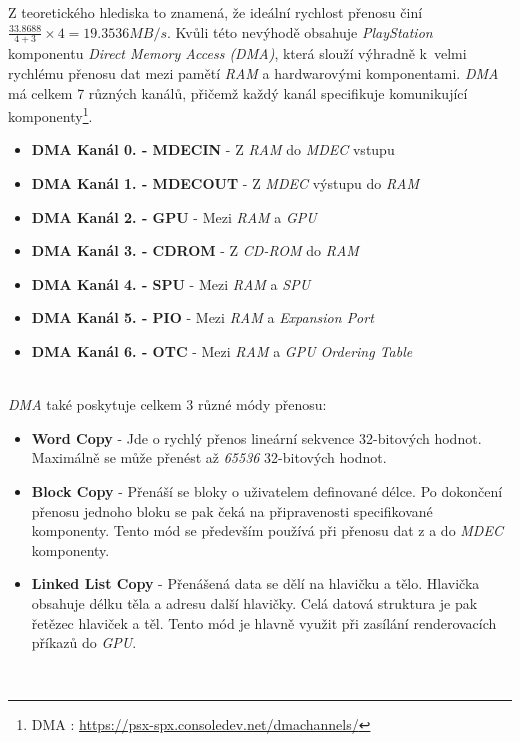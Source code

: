 Z teoretického hlediska to znamená, že ideální rychlost přenosu činí $\frac{33.8688}{4+3}\times4 = 19.3536 MB/s$. 
Kvůli této nevýhodě obsahuje \textit{PlayStation} komponentu \textit{Direct Memory Access (DMA)}, 
která slouží výhradně k~velmi rychlému přenosu dat mezi pamětí \textit{RAM} a hardwarovými komponentami. 
\textit{DMA} má celkem 7 různých kanálů, přičemž každý kanál specifikuje komunikující komponenty\footnote{DMA \cite{PSXSpec}: \url{https://psx-spx.consoledev.net/dmachannels/}}.\\[\baselineskip]
\begin{minipage}{\textwidth}
\begin{itemize}
    \item{\textbf{DMA Kanál 0. - MDECIN} - Z \textit{RAM} do \textit{MDEC} vstupu}
    \item{\textbf{DMA Kanál 1. - MDECOUT} - Z \textit{MDEC} výstupu do \textit{RAM}}
    \item{\textbf{DMA Kanál 2. - GPU} - Mezi \textit{RAM} a \textit{GPU}}
    \item{\textbf{DMA Kanál 3. - CDROM} - Z \textit{CD-ROM} do \textit{RAM}}
    \item{\textbf{DMA Kanál 4. - SPU} - Mezi \textit{RAM} a \textit{SPU}}
    \item{\textbf{DMA Kanál 5. - PIO} - Mezi \textit{RAM} a \textit{Expansion Port}}
    \item{\textbf{DMA Kanál 6. - OTC} - Mezi \textit{RAM} a \textit{GPU Ordering Table}}
\end{itemize}
\end{minipage}
\\[\baselineskip]
\textit{DMA} také poskytuje celkem 3 různé módy přenosu:\\[\baselineskip]
\begin{minipage}{\textwidth}
\begin{itemize}
    \item{\textbf{Word Copy} - Jde o rychlý přenos lineární sekvence 32-bitových hodnot. Maximálně se může přenést až \textit{65536} 32-bitových hodnot.}
    \item{\textbf{Block Copy} - Přenáší se bloky o uživatelem definované délce. Po dokončení přenosu jednoho bloku se pak čeká na připravenosti specifikované komponenty. Tento mód se především používá při přenosu dat z a do \textit{MDEC} komponenty. }
    \item{\textbf{Linked List Copy} - Přenášená data se dělí na hlavičku a tělo. Hlavička obsahuje délku těla a adresu další hlavičky. Celá datová struktura je pak řetězec hlaviček a těl. Tento mód je hlavně využit při zasílání renderovacích příkazů do \textit{GPU}. }
\end{itemize}
\end{minipage}
\\[\baselineskip]

